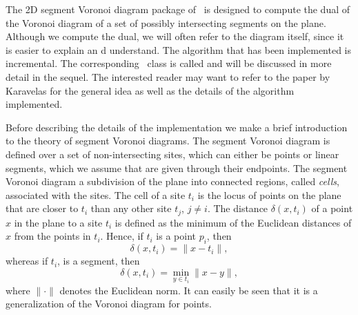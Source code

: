 The 2D segment Voronoi diagram package of \cgal\ is designed to
compute the dual of the Voronoi diagram of a set of possibly
intersecting segments on the plane. Although we compute the dual, we
will often refer to the diagram itself, since it is easier to
explain an d understand. The algorithm that has been
implemented is incremental. The corresponding \cgal\ class is called
and will be discussed in more detail in the sequel. The interested
reader may want to refer to the paper by Karavelas
\cite{cgal:k-reisv-04} for the general idea as well as the details of
the algorithm implemented.

Before describing the details of the implementation we make a brief
introduction to the theory of segment Voronoi diagrams.
The segment Voronoi diagram is defined over a set of non-intersecting
sites, which can either be points or linear segments, which we assume
that are given through their endpoints. The segment Voronoi diagram a
subdivision of the plane into connected regions, called {\em cells},
associated with the sites. The cell of a site $t_i$ is the locus of
points on the plane that are closer to $t_i$ than any other site
$t_j$, $j\neq i$.
The distance $\delta(x, t_i)$ of a point $x$ in the plane to a 
site $t_i$ is defined as the minimum of the Euclidean distances of $x$
from the points in $t_i$. Hence, if $t_i$ is a point $p_i$, then
\[      \delta(x,t_i)=\|x-t_i\|,  \]
whereas if $t_i$, is a segment, then
\[      \delta(x,t_i)=\min_{y\in t_i}\|x-y\|, \]
where $\|\cdot\|$ denotes the Euclidean norm.
It can easily be seen that it is a generalization of the Voronoi
diagram for points.

